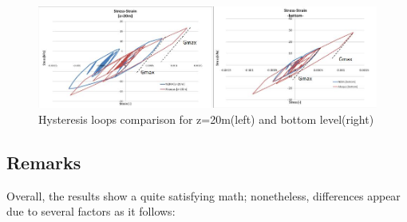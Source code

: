 \documentclass[10pt,a4paper]{report}
\begin{document}
\begin{figure}[h!]
	\centering
	\includegraphics[width=0.7\linewidth]{"tau_gamma2"}
	\caption{Hysteresis loops comparison for z=20m(left) and bottom level(right)}
	\label{tau_gamma2}
\end{figure}

\subsection{Remarks}
Overall, the results show a quite satisfying math; nonetheless, differences appear due to several factors as it follows:
\end{document}
